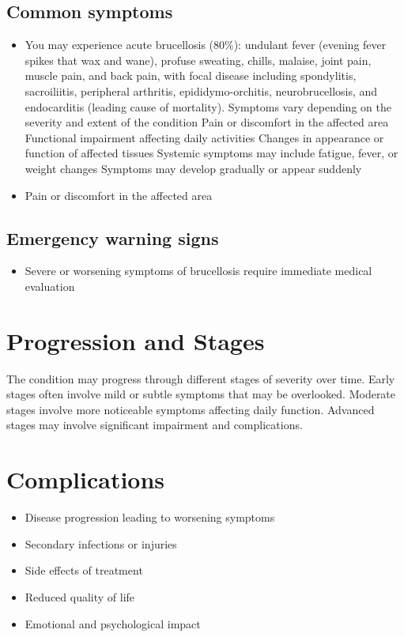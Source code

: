 \subsection{Common symptoms}
\begin{itemize}[noitemsep]
  \item You may experience acute brucellosis (80\%): undulant fever (evening fever spikes that wax and wane), profuse sweating, chills, malaise, joint pain, muscle pain, and back pain, with focal disease including spondylitis, sacroiliitis, peripheral arthritis, epididymo-orchitis, neurobrucellosis, and endocarditis (leading cause of mortality). Symptoms vary depending on the severity and extent of the condition Pain or discomfort in the affected area Functional impairment affecting daily activities Changes in appearance or function of affected tissues Systemic symptoms may include fatigue, fever, or weight changes Symptoms may develop gradually or appear suddenly
  \item Pain or discomfort in the affected area
  \end{itemize}

\subsection{Emergency warning signs}
\begin{itemize}[noitemsep]
  \item Severe or worsening symptoms of brucellosis require immediate medical evaluation
\end{itemize}
\section{Progression and Stages}
The condition may progress through different stages of severity over time. Early stages often involve mild or subtle symptoms that may be overlooked. Moderate stages involve more noticeable symptoms affecting daily function. Advanced stages may involve significant impairment and complications.
\section{Complications}
\begin{itemize}[noitemsep]
  \item Disease progression leading to worsening symptoms
  \item Secondary infections or injuries
  \item Side effects of treatment
  \item Reduced quality of life
  \item Emotional and psychological impact
\end{itemize}
